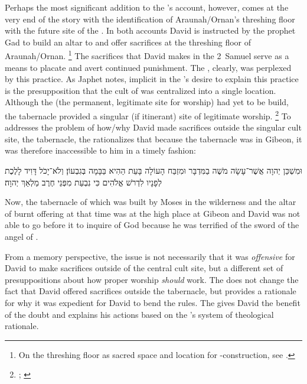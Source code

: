 Perhaps the most significant addition to the \chronicler's account, however, comes at the very end of the story with the identification of Araunah/Ornan's threshing floor with the future site of the \jerusalemtemple. In both accounts David is instructed by the prophet Gad to build an altar to \yahweh and offer sacrifices at the threshing floor of Araunah/Ornan.%
    \footnote{On the threshing floor as  sacred space and location for \temple-construction, see 
        \cite[125--144]{waters2015}.}
The sacrifices that David makes in the 2~Samuel serve as a means to placate \yahweh and avert continued punishment. The \chronicler, clearly, was perplexed by this practice. As Japhet notes, implicit in the \chronicler's desire to explain this practice is the presupposition that the cult of \yahweh was centralized into a single location. Although the \temple (the permanent, legitimate site for worship) had yet to be build, the tabernacle provided a singular (if itinerant) site of legitimate worship.%
    \footnote{\cite[389]{japhet1993}; \cite[760--761]{knoppers2007}}
To addresses the problem of how/why David made sacrifices outside the singular cult site, the tabernacle, the \chronicler rationalizes that because the tabernacle was in Gibeon, it was therefore inaccessible to him in a timely fashion:
\begin{hebrewtext}
    וּמִשְׁכַּן יְהוָה אֲשֶׁר־עָשָׂה מֹשֶׁה בַמִּדְבָּר וּמִזְבַּח הָעוֹלָה בָּעֵת הַהִיא בַּבָּמָה בְּגִבְעוֹן׃ 
    וְלֹא־יָכֹל דָּוִיד לָלֶכֶת לְפָנָיו לִדְרֹשׁ אֱלֹהִים כִּי נִבְעַת מִפְּנֵי חֶרֶב מַלְאַךְ יְהוָה׃
\end{hebrewtext}
\begin{translation}
    Now, the tabernacle of \yahweh which was built by Moses in the wilderness and the altar of burnt offering at that time was at the high place at Gibeon
    and David was not able to go before it to inquire of God because he was terrified of the sword of the angel of \yahweh.
\end{translation}
\noindent
From a memory perspective, the issue is not necessarily that it was \emph{offensive} for David to make sacrifices outside of the central cult site, but a different set of presuppositions about how proper worship \emph{should} work. The \chronicler does not change the fact that David offered sacrifices outside the tabernacle, but provides a rationale for why it was expedient for David to bend the rules. The \chronicler gives David the benefit of the doubt and explains his actions based on the \chronicler's system of theological rationale.

